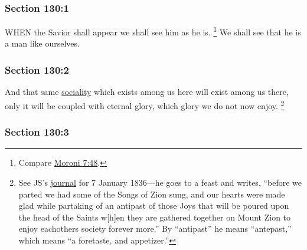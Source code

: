	\subsubsection{Section 130:1} %
		\label{DC130-1}

		WHEN the Savior shall appear we shall see him as he is.%
			\footnote{%
				Compare \hyperref[MORONI-7-48]{Moroni 7:48}.
				}
		We shall see that he is a man like ourselves.


	\subsubsection{Section 130:2} %
		\label{DC130-2}

		And that same \hyperref[SOCIALITY]{sociality} which exists among us here will exist among us there, only it will be coupled with eternal glory, which glory we do not now enjoy.%
			\footnote{%
				\label{DC130-2-enjoy}%
				See JS's \hyperref[EMS-1836-JS-7-JAN-1836]{journal} for 7 January 1836---he goes to a feast and writes, ``before we parted we had some of the Songs of Zion sung, and our hearts were made glad while partaking of an antipast of those Joys that will be poured upon the head of the Saints w[h]en they are gathered together on Mount Zion to enjoy eachothers society forever more.'' By ``antipast'' he means ``antepast,'' which means ``a foretaste, and appetizer.''
				}


	\subsubsection{Section 130:3} %
		\label{DC130-3}

